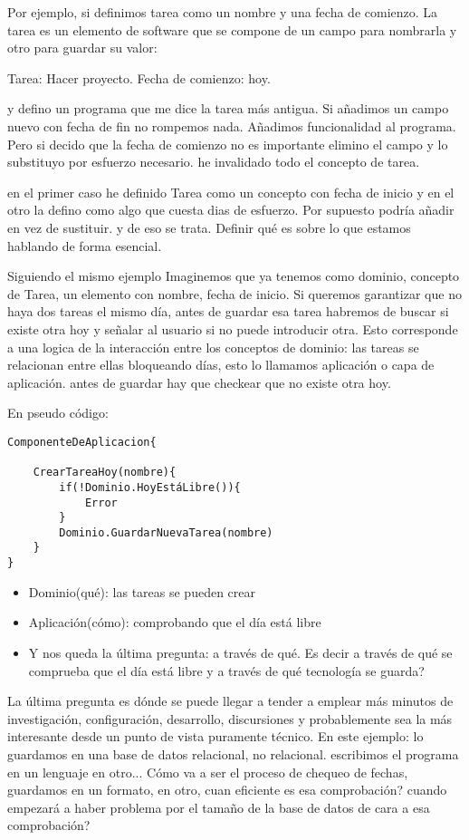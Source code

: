 Por ejemplo, si definimos tarea como un nombre y una fecha de comienzo. La tarea es un elemento de software que se compone de un campo para nombrarla y otro para guardar su valor:

Tarea: Hacer proyecto.
Fecha de comienzo: hoy.

y defino un programa que me dice la tarea más antigua. Si añadimos un campo nuevo con fecha de fin no rompemos nada. Añadimos funcionalidad al programa. Pero si decido que la fecha de comienzo no es importante elimino el campo y lo substituyo por esfuerzo necesario. he invalidado todo el concepto de tarea.

en el primer caso he definido Tarea como un concepto con fecha de inicio y en el otro la defino como algo que cuesta dias de esfuerzo. Por supuesto podría añadir en vez de sustituir. y de eso se trata. Definir qué es sobre lo que estamos hablando de forma esencial.

Siguiendo el mismo ejemplo Imaginemos que ya tenemos como dominio, concepto de Tarea, un elemento con nombre, fecha de inicio. Si queremos garantizar que no haya dos tareas el mismo día, antes de guardar esa tarea habremos de buscar si existe otra hoy y señalar al usuario si no puede introducir otra. Esto corresponde a una logica de la interacción entre los conceptos de dominio: las tareas se relacionan entre ellas bloqueando días, esto lo llamamos aplicación o capa de aplicación. antes de guardar hay que checkear que no existe otra hoy.

En pseudo código:
\begin{verbatim}
ComponenteDeAplicacion{

    CrearTareaHoy(nombre){
        if(!Dominio.HoyEstáLibre()){
            Error
        }
        Dominio.GuardarNuevaTarea(nombre)
    }
}
\end{verbatim}

\begin{itemize}
    \item Dominio(qué): las tareas se pueden crear
    \item Aplicación(cómo): comprobando que el día está libre
    \item Y  nos queda la última pregunta: a través de qué. Es decir a través de qué se comprueba que el día está libre y a través de qué tecnología se guarda?
\end{itemize}

La última pregunta es dónde se puede llegar a tender a emplear más minutos de investigación, configuración, desarrollo, discursiones y probablemente sea la más interesante desde un punto de vista puramente técnico. En este ejemplo: lo guardamos en una base de datos relacional, no relacional. escribimos el programa en un lenguaje en otro... Cómo va a ser el proceso de chequeo de fechas, guardamos en un formato, en otro, cuan eficiente es esa comprobación? cuando empezará a haber problema por el tamaño de la base de datos de cara a esa comprobación?

